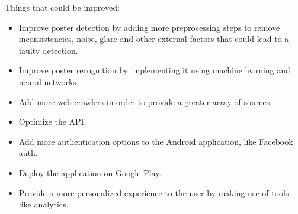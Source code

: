 \documentclass[12pt,a4paper,twoside]{report}
\begin{document}
\noindent Things that could be improved:
\begin{itemize}
    \item Improve poster detection by adding more preprocessing steps to remove inconsistencies, noise, glare and other external factors that could lead to a faulty detection.
    \item Improve poster recognition by implementing it using machine learning and neural networks.
    \item Add more web crawlers in order to provide a greater array of sources.
    \item Optimize the API.
    \item Add more authentication options to the Android application, like Facebook auth.
    \item Deploy the application on Google Play.
    \item Provide a more personalized experience to the user by making use of tools like analytics.
\end{itemize}
\end{document}
